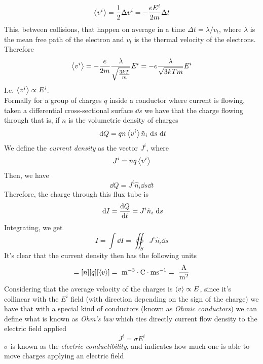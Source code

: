 \documentclass[../electromagnetism]{subfiles}
\begin{document}
\begin{equation*}
	\expval{v^i}=\frac{1}{2}\Delta v^i=-\frac{eE^i}{2m}\Delta t
\end{equation*}
This, between collisions, that happen on average in a time $\Delta t=\lambda/v_t$, where $\lambda$ is the mean free path of the electron and $v_t$ is the thermal velocity of the electrons. Therefore
\begin{equation*}
	\expval{v^i}=-\frac{e}{2m}\frac{\lambda}{\sqrt{\frac{3kT}{m}}}E^i=-e\frac{\lambda}{\sqrt{3kTm}}E^i
\end{equation*}
I.e. $\expval{v^i}\propto E^i$.\\
Formally for a group of charges $q$ inside a conductor where current is flowing, taken a differential cross-sectional surface $\dd s$ we have that the charge flowing through that is, if $n$ is the volumetric density of charges
\begin{equation*}
	\ \mathrm{d} Q=qn\expval{v^i}\hat{n}_i\ \mathrm{d} s\ \mathrm{d} t
\end{equation*}
We define the \textit{current density} as the vector $J^i$, where
\begin{equation*}
	J^i=nq\expval{v^i}
\end{equation*}
Then, we have
\begin{equation}
	\dd Q=J^i\hat{n}_i\dd s\dd t
	\label{eq:currdensity}
\end{equation}
Therefore, the charge through this flux tube is
\begin{equation*}
	\ \mathrm{d} I=\dv{Q}{t}=J^i\hat{n}_i\ \mathrm{d} s
\end{equation*}
Integrating, we get
\begin{equation}
	I=\int\dd I=\oiint_{S}J^i\hat{n}_i\dd s
	\label{eq:currentflux}
\end{equation}
It's clear that the current density then has the following units
\begin{equation*}
	[J]=[n][q][\expval{v}]=\unit{m^{-3}\cdot C\cdot ms^{-1}}=\unit{\frac{A}{m^2}}
\end{equation*}
Considering that the average velocity of the charges is $\expval{v}\propto E$, since it's collinear with the $E^i$ field (with direction depending on the sign of the charge) we have that with a special kind of conductors (known as \textit{Ohmic conductors}) we can define what is known as \textit{Ohm's law} which ties directly current flow density to the electric field applied
\begin{equation}
	J^i=\sigma E^i
	\label{eq:ohmlaw}
\end{equation}
$\sigma$ is known as the \textit{electric conductibility}, and indicates how much one is able to move charges applying an electric field
\end{document}
